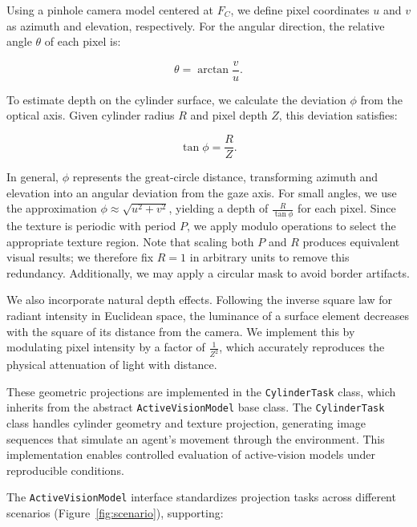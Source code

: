 \documentclass[12pt,a4paper]{article}
\begin{document}
Using a pinhole camera model centered at $F_C$, we define pixel coordinates $u$ and $v$ as azimuth and elevation, respectively. For the angular direction, the relative angle $\theta$ of each pixel is:

\begin{equation}
\theta = \arctan\frac{v}{u}.
\end{equation}

To estimate depth on the cylinder surface, we calculate the deviation $\phi$ from the optical axis. Given cylinder radius $R$ and pixel depth $Z$, this deviation satisfies:

\begin{equation}
\tan \phi = \frac{R}{Z}.
\end{equation}

In general, $\phi$ represents the great-circle distance, transforming azimuth and elevation into an angular deviation from the gaze axis. For small angles, we use the approximation $\phi \approx \sqrt{u^2 + v^2}$, yielding a depth of $\frac{R}{\tan \phi}$ for each pixel. Since the texture is periodic with period $P$, we apply modulo operations to select the appropriate texture region. Note that scaling both $P$ and $R$ produces equivalent visual results; we therefore fix $R=1$ in arbitrary units to remove this redundancy. Additionally, we may apply a circular mask to avoid border artifacts.

We also incorporate natural depth effects. Following the inverse square law for radiant intensity in Euclidean space, the luminance of a surface element decreases with the square of its distance from the camera. We implement this by modulating pixel intensity by a factor of $\frac{1}{Z^2}$, which accurately reproduces the physical attenuation of light with distance.

These geometric projections are implemented in the \texttt{CylinderTask} class, which inherits from the abstract \texttt{ActiveVisionModel} base class. The \texttt{CylinderTask} class handles cylinder geometry and texture projection, generating image sequences that simulate an agent's movement through the environment. This implementation enables controlled evaluation of active-vision models under reproducible conditions.

The \texttt{ActiveVisionModel} interface standardizes projection tasks across different scenarios (Figure~\ref{fig:scenario}), supporting:
\end{document}
